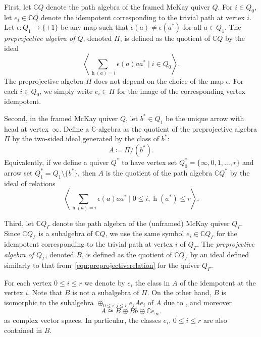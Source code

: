 \documentclass[11pt]{article}
\numberwithin{equation}{section}
\newcommand{\SC}{\mathbb{C}} %
\newcommand{\head}{\operatorname{h}}
\newcommand{\PiGamma}{B}
\newcommand{\PiQ}{A}
\numberwithin{equation}{section}
\begin{document}
First, let $\SC Q$ denote the path algebra of the framed McKay quiver $Q$. For $i \in Q_0$, let $e_i \in \SC Q$ denote the idempotent corresponding to the trivial path at vertex $i$. Let $\epsilon\colon Q_1 \to \{\pm 1\}$ be any map such that $\epsilon(a) \neq \epsilon(a^{\ast})$ for all $a \in Q_1$. The \emph{preprojective algebra of $Q$}, denoted $\Pi$, is defined as the quotient of $\SC Q$ by the ideal
\begin{equation}
\label{eqn:preprojectiverelation}
\left\langle \sum_{\head(a)=i} \epsilon(a) aa^{\ast} \mid {i \in Q_0}
\right\rangle.
\end{equation}
 The preprojective algebra $\Pi$ does not depend on the choice of the map $\epsilon$. For each $i\in Q_0$, we simply write $e_i\in \Pi$ for the image of the corresponding vertex idempotent.

Second, in the framed McKay quiver $Q$, let $b^*\in Q_1$ be the unique arrow with head at vertex~$\infty$. Define a $\SC$-algebra as the quotient of the preprojective algebra $\Pi$ by the two-sided ideal generated by the class of $b^*$:
 \[
 \PiQ\coloneqq \Pi/(b^*).
 \]
 Equivalently, if we define a quiver $Q^*$ to have vertex set $Q^*_0=\{\infty,0,1,\dots,r\}$ and arrow set $Q_1^*=Q_1\setminus \{b^*\}$, then $\PiQ$ is the quotient of the path algebra $\SC Q^*$ by the ideal of relations
 \begin{equation*}%
 \left\langle \sum_{\head(a) = i} \epsilon(a) aa^* \mid 0\leq i,
 \head(a^*)\leq r \right\rangle.
 \end{equation*}

 Third, let $\SC Q_\Gamma$ denote the path algebra of the (unframed) McKay quiver $Q_\Gamma$. Since $\SC Q_\Gamma$ is a subalgebra of $\SC Q$, we use the same symbol $e_i\in \SC Q_\Gamma$ for the idempotent corresponding to the trivial path at vertex $i$ of $Q_\Gamma$. The \emph{preprojective algebra of $Q_\Gamma$}, denoted $\PiGamma$, is defined as the quotient of $\SC Q_\Gamma$ by an ideal defined similarly to that from~\eqref{eqn:preprojectiverelation} for the quiver $Q_\Gamma$.

\begin{Remark}
 For each vertex $0\leq i\leq r$ we denote by $e_i$ the class in $\PiQ$ of the idempotent at the vertex $i$. Note that $\PiGamma$ is not a subalgebra of $\Pi$. On the other hand, $\PiGamma$ is isomorphic to the subalgebra $\oplus_{0 \leq i,j \leq r} e_j\PiQ e_i$ of $\PiQ$ due to \cite[Lemma~3.2]{craw2019punctual}, and moreover
 \begin{equation} \label{eq:PiQdecomp}
 \PiQ \cong \PiGamma \oplus \PiGamma b \oplus \SC e_\infty.
\end{equation}
as complex vector spaces. In particular, the classes $e_i$, $0 \leq i \leq r$ are also contained in $\PiGamma$.
\end{Remark}
\end{document}
